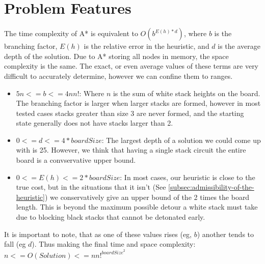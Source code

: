 \documentclass[11pt]{article}
\theoremstyle{definition}
\begin{document}
    \section{Problem Features}
    The time complexity of A* is equivalent to $O(b^{E(h)*d})$, where $b$ is the branching factor, $E(h)$ is the
    relative error in the heuristic, and $d$ is the average depth of the solution. Due to A* storing all nodes in memory,
    the space complexity is the same. The exact, or even average values of these terms are very difficult to accurately determine, however we can confine them to ranges.
    \begin{itemize}
        \item $5n <= b <= 4nn!$: Where $n$ is the sum of white stack heights on the board. The branching factor is larger when larger stacks are formed, however in most tested cases stacks greater than size 3 are never formed, and the starting state generally does not have stacks larger than 2.
        \item $0 <= d <= 4*boardSize$: The largest depth of a solution we could come up with is 25. However, we think that having a single stack circuit the entire board is a convservative upper bound.
        \item $0<= E(h) <= 2*boardSize$: In most cases, our heuristic is close to the true cost, but in the situations that it isn't (See \ref{subsec:admissibility-of-the-heuristic}) we conservatively give an upper bound of the 2 times the board length. This is beyond the maximum possible detour a white stack must take due to blocking black stacks that cannot be detonated early.
    \end{itemize}
    It is important to note, that as one of these values rises (eg, $b$) another tends to fall (eg $d$).
    Thus making the final time and space complexity: $n <= O(Solution) <= {nn!}^{{boardSize}^2}$
\end{document}
